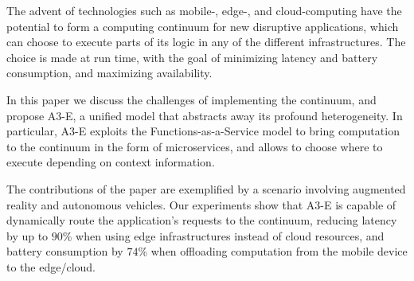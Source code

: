 
The advent of technologies such as mobile-, edge-, and cloud-computing have the potential to form a computing continuum for new disruptive applications, which can choose to execute parts of its logic in any of the different infrastructures. The choice is made at run time, with the goal of minimizing latency and battery consumption, and maximizing availability.

In this paper we discuss the challenges of implementing the continuum, and propose A3-E, a unified model that abstracts away its profound heterogeneity. In particular, A3-E exploits the Functions-as-a-Service model to bring computation to the continuum in the form of microservices, and allows to choose where to execute depending on context information.

The contributions of the paper are exemplified by a scenario involving augmented reality and autonomous vehicles. Our experiments show that A3-E is capable of dynamically route the application's requests to the continuum, reducing latency by up to $90$\% when using edge infrastructures instead of cloud resources, and battery consumption by $74$\% when offloading computation from the mobile device to the edge/cloud.




